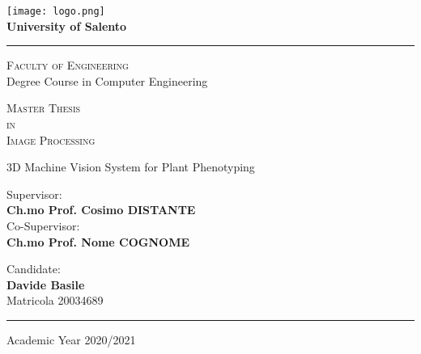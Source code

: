 

\linespread{1.5}

\begin{titlepage}
 
\begin{center}
 
\texttt{[image: logo.png]}
\\
\vspace{.3cm}
\textbf{\Large University of Salento}
\vspace{.2cm}
\hrule

\begin{center}
	\doublespacing
	\textsc{\Large Faculty of Engineering} \\

	\textmd{\Large Degree Course in Computer Engineering}
	
	\vspace{1cm} 
	\textsc{\Large Master Thesis} \\
	\textsc{\Large in} \\
	\textsc{\Large Image Processing}	
	\vspace{2.3cm}
	
	\Huge \doublespacing \bfseries \begin{spacing}{1}{3D Machine Vision System for Plant Phenotyping}\end{spacing}
\end{center}
 
\hfill
\vspace{2.5cm}

\begin{flushleft}
	\begin{minipage}[c]{.55\textwidth}
		\singlespacing
		\fontsize{12}{12} \textmd{Supervisor:} \\
		\fontsize{14.4}{12} \textbf{Ch.mo Prof. Cosimo DISTANTE} \\
		\fontsize{12}{12} \textmd{Co-Supervisor:} \\
		\fontsize{14.4}{12} \textbf{Ch.mo Prof. Nome COGNOME}
	\end{minipage}%
	\hspace{10mm}%
	\begin{minipage}[c]{.35\textwidth}
		\bigskip
		\bigskip
		\singlespacing
		\fontsize{12}{12} \textmd{Candidate:} \\
		\fontsize{14.4}{12} \textbf{Davide Basile} \\
		\fontsize{12}{12} \textmd{Matricola 20034689} \\
	\end{minipage}
\end{flushleft}

\vfill
\hfill

\vspace{.25cm}
\hrule
\vspace{.25cm}
{\small Academic Year 2020/2021} 
\end{center}
\clearpage
\end{titlepage}

\restoregeometry
